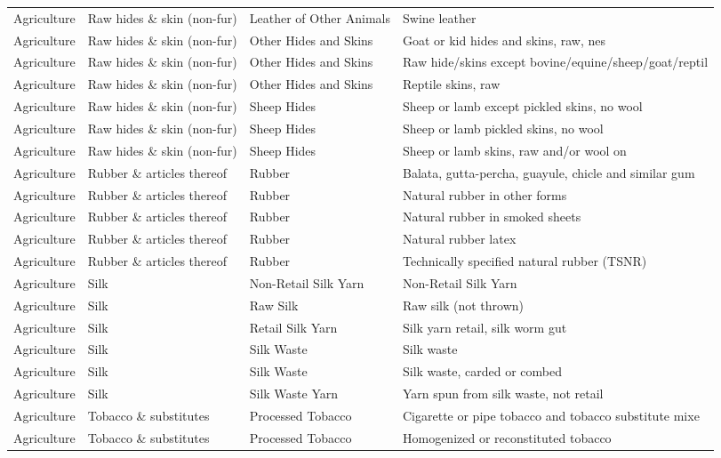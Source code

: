 \begin{appendices}
\begin{xltabular}{\textwidth}{|p{0.07\textwidth}|p{0.28\textwidth}|p{0.24\textwidth}|p{0.31\textwidth}|}
	Agriculture & Raw hides \& skin (non-fur) & Leather of Other Animals & Swine leather \\
	Agriculture & Raw hides \& skin (non-fur) & Other Hides and Skins & Goat or kid hides and skins, raw, nes \\
	Agriculture & Raw hides \& skin (non-fur) & Other Hides and Skins & Raw hide/skins except bovine/equine/sheep/goat/reptil \\
	Agriculture & Raw hides \& skin (non-fur) & Other Hides and Skins & Reptile skins, raw \\
	Agriculture & Raw hides \& skin (non-fur) & Sheep Hides & Sheep or lamb except pickled skins, no wool \\
	Agriculture & Raw hides \& skin (non-fur) & Sheep Hides & Sheep or lamb pickled skins, no wool \\
	Agriculture & Raw hides \& skin (non-fur) & Sheep Hides & Sheep or lamb skins, raw and/or wool on \\
	Agriculture & Rubber \& articles thereof & Rubber & Balata, gutta-percha, guayule, chicle and similar gum \\
	Agriculture & Rubber \& articles thereof & Rubber & Natural rubber in other forms \\
	Agriculture & Rubber \& articles thereof & Rubber & Natural rubber in smoked sheets \\
	Agriculture & Rubber \& articles thereof & Rubber & Natural rubber latex \\
	Agriculture & Rubber \& articles thereof & Rubber & Technically specified natural rubber (TSNR) \\
	Agriculture & Silk & Non-Retail Silk Yarn & Non-Retail Silk Yarn \\
	Agriculture & Silk & Raw Silk & Raw silk (not thrown) \\
	Agriculture & Silk & Retail Silk Yarn & Silk yarn retail, silk worm gut \\
	Agriculture & Silk & Silk Waste & Silk waste \\
	Agriculture & Silk & Silk Waste & Silk waste, carded or combed \\
	Agriculture & Silk & Silk Waste Yarn & Yarn spun from silk waste, not retail \\
	Agriculture & Tobacco \& substitutes & Processed Tobacco & Cigarette or pipe tobacco and tobacco substitute mixe \\
	Agriculture & Tobacco \& substitutes & Processed Tobacco & Homogenized or reconstituted tobacco \\

\end{xltabular}
\end{appendices}
